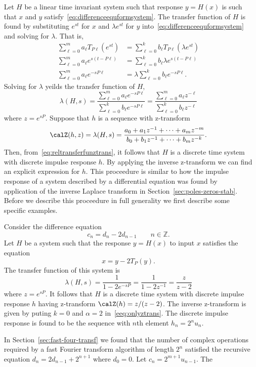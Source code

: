 \documentclass[11pt,a4paper]{book}
\theoremstyle{plain}
\numberwithin{equation}{section}
\newcommand{\ints}{{\mathbb Z}}
\begin{document}
Let $H$ be a linear time invariant system such that response $y = H(x)$ is such that $x$ and $y$ satisfy~\eqref{eq:differenceequformsystem}.  The transfer function of $H$ is found by substituting $e^{st}$ for $x$ and $\lambda e^{st}$ for $y$ into~\eqref{eq:differenceequformsystem} and solving for $\lambda$.  That is,
\begin{align*}
\sum_{\ell=0}^{m} a_\ell T_{P\ell}(e^{st}) &= \sum_{\ell=0}^{k} b_\ell T_{P\ell}(\lambda e^{st}) \\
\sum_{\ell=0}^{m} a_\ell e^{s(t-P\ell)} &= \sum_{\ell=0}^{k} b_\ell \lambda e^{s(t-P\ell)} \\
\sum_{\ell=0}^{m} a_\ell e^{-sP\ell} &= \lambda \sum_{\ell=0}^{k} b_\ell e^{-sP\ell}.
\end{align*}
Solving for $\lambda$ yeilds the transfer function of $H$,
\[
\lambda(H,s) = \frac{\sum_{\ell=0}^{m} a_\ell e^{-sP\ell}}{\sum_{\ell=0}^{k} b_\ell e^{-sP\ell}} = \frac{\sum_{\ell=0}^{m} a_\ell z^{-\ell}}{\sum_{\ell=0}^{k} b_\ell z^{-\ell}}
\]
where $z = e^{sP}$.  Suppose that $h$ is a sequence with z-transform
\[
\calZ(h,z) = \lambda(H,s) = \frac{a_0 + a_1 z^{-1} + \dots + a_m z^{-m}}{b_0 + b_1 z^{-1} + \dots + b_m z^{-k}}.
\]
Then, from~\eqref{eq:reltransferfunztrans}, it follows that $H$ is a discrete time system with discrete impulse response $h$.  By applying the inverse z-transform we can find an explicit expression for $h$.  This proceedure is similar to how the impulse response of a system described by a differential equation was found by application of the inverse  Laplace transform in Section~\ref{sec:poles-zeros-stab}.  Before we describe this proceedure in full generality we first describe some specific examples.

Consider the difference equation
\[
c_n = d_n - 2 d_{n-1} \qquad n \in \ints.
\]
Let $H$ be a system such that the response $y = H(x)$ to input $x$ satisfies the equation
\[
x = y - 2 T_{P}(y).
\]
The transfer function of this system is
\[
\lambda(H,s) = \frac{1}{1 - 2e^{-sP}} = \frac{1}{1 - 2z^{-1}} = \frac{z}{z - 2}
\]
where $z = e^{sP}$.  It follows that $H$ is a discrete time system with discrete impulse response $h$ having z-transform $\calZ(h) = z/(z-2)$.  The inverse z-transform is given by puting $k=0$ and $\alpha = 2$ in~\eqref{eeq:onlyztrans}.  The discrete impulse response is found to be the sequence with $n$th element $h_n = 2^n u_n$.

In Section~\ref{sec:fast-four-transf} we found that the number of complex operations required by a fast Fourier transform algorithm of length $2^n$ satisfied the recursive equation $d_n = 2d_{n-1} + 2^{n+1}$ where $d_0 = 0$.  Let $c_n = 2^{m+1}u_{n-1}$.  The 
\end{document}
